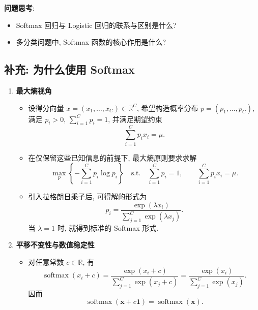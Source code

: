 \documentclass{../nndlcourse}
\begin{document}
\textbf{问题思考}:
\begin{itemize}
    \item Softmax 回归与 Logistic 回归的联系与区别是什么?
    \item 多分类问题中, Softmax 函数的核心作用是什么?
\end{itemize}

\subsection{补充: 为什么使用 Softmax}
\begin{enumerate}
    \item \textbf{最大熵视角}
    \begin{itemize}
        \item 设得分向量 $x = (x_1, \dots, x_C) \in \mathbb{R}^C$, 希望构造概率分布 $p = (p_1, \dots, p_C)$, 满足 $p_i > 0$, $\sum_{i=1}^C p_i = 1$, 并满足期望约束
        \begin{equation*}
            \sum_{i=1}^C p_i x_i = \mu.
        \end{equation*}
        \item 在仅保留这些已知信息的前提下, 最大熵原则要求求解
        \begin{equation*}
            \max_p \left\{- \sum_{i=1}^C p_i \log p_i\right\}
            \quad \text{s.t.} \quad
            \sum_{i=1}^C p_i = 1, \qquad
            \sum_{i=1}^C p_i x_i = \mu.
        \end{equation*}
        \item 引入拉格朗日乘子后, 可得解的形式为
        \begin{equation*}
            p_i = \frac{\exp(\lambda x_i)}{\sum_{j=1}^C \exp(\lambda x_j)}.
        \end{equation*}
        当 $\lambda = 1$ 时, 就得到标准的 Softmax 形式.
    \end{itemize}
    \item \textbf{平移不变性与数值稳定性}
    \begin{itemize}
        \item 对任意常数 $c \in \mathbb{R}$, 有
        \begin{equation*}
            \operatorname{softmax}(x_i + c)
            = \frac{\exp(x_i + c)}{\sum_{j=1}^C \exp(x_j + c)}
            = \frac{\exp(x_i)}{\sum_{j=1}^C \exp(x_j)}.
        \end{equation*}
        因而
        \begin{equation*}
            \operatorname{softmax}(\boldsymbol{x} + c\mathbf{1}) = \operatorname{softmax}(\boldsymbol{x}).

\end{equation*}
\end{itemize}
\end{enumerate}
\end{document}
